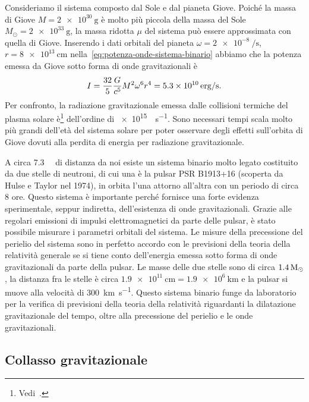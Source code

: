 Consideriamo il sistema composto dal Sole e dal pianeta Giove.  Poiché la massa
di Giove $M = \SI{2e30}{\gram}$ è molto più piccola della massa del Sole
$M_{\odot} = \SI{2e33}{\gram}$, la massa ridotta $\mu$ del sistema può essere
approssimata con quella di Giove.  Inserendo i dati orbitali del pianeta
$\omega = \SI{2e-8}{\per\second}$,
$r = \SI{8e13}{\centi\metre}$ nella~\eqref{eq:potenza-onde-sistema-binario}
abbiamo che la potenza emessa da Giove sotto forma di onde gravitazionali è
\begin{equation}
  I = \frac{32}{5} \frac{G}{c^{5}} M^{2} \omega^{6} r^{4} =
  \SI{5.3e10}{erg\per\second}.
\end{equation}
Per confronto, la radiazione gravitazionale emessa dalle collisioni termiche del
plasma solare è\footnote{Vedi~\textcite[266]{weinberg:gravitation}.}
dell'ordine di \SI{e15}{\erg\per\second}.  Sono necessari tempi scala molto più
grandi dell'età del sistema solare per poter osservare degli effetti sull'orbita
di Giove dovuti alla perdita di energia per radiazione gravitazionale.

A circa \SI{7.3}{\kilo\parsec} di distanza da noi esiste un sistema binario
molto legato costituito da due stelle di neutroni, di cui una è la pulsar PSR
B1913+16 (scoperta da Hulse e Taylor nel 1974), in orbita l'una attorno
all'altra con un periodo di circa $8$ ore.  Questo sistema è importante perché
fornisce una forte evidenza sperimentale, seppur indiretta, dell'esistenza di
onde gravitazionali.  Grazie alle regolari emissioni di impulsi elettromagnetici
da parte delle pulsar, è stato possibile misurare i parametri orbitali del
sistema.  Le misure della precessione del perielio del sistema sono in perfetto
accordo con le previsioni della teoria della relatività generale se si tiene
conto dell'energia emessa sotto forma di onde gravitazionali da parte della
pulsar.  Le masse delle due stelle sono di circa $\SI{1.4}{\ensuremath{M_{\odot}}}$, la
distanza fra le stelle è circa
$\SI{1.9e11}{\centi\metre} = \SI{1.9e6}{\kilo\metre}$ e la pulsar si muove alla
velocità di \SI{300}{\kilo\metre\per\second}.  Questo sistema binario funge da
laboratorio per la verifica di previsioni della teoria della relatività
riguardanti la dilatazione gravitazionale del tempo, oltre alla precessione del
perielio e le onde gravitazionali.

\subsection{Collasso gravitazionale}
\label{sec:collasso-grav}

